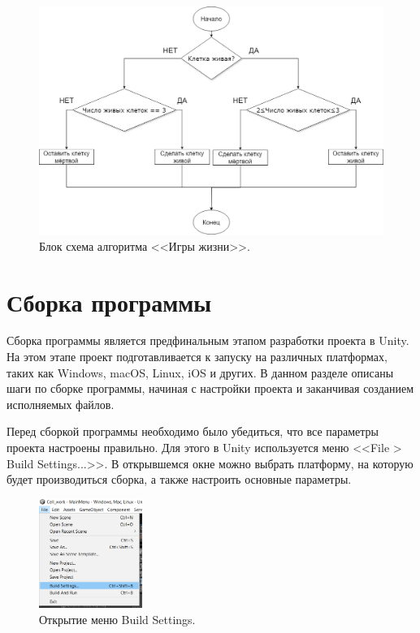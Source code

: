 \begin{figure}[H]
	\centering
	\includegraphics[width=1\textwidth]{images/БлокСхема.png}  
	\caption{Блок схема алгоритма <<Игры жизни>>.}
	\label{fig4}
\end{figure}

\section{\label{sec:ch02/sec01/sub05}Сборка программы}

Сборка программы является предфинальным этапом разработки проекта в Unity. На этом этапе проект подготавливается к запуску на различных платформах, таких как Windows, macOS, Linux, iOS и других. В данном разделе описаны шаги по сборке программы, начиная с настройки проекта и заканчивая созданием исполняемых файлов.

Перед сборкой программы необходимо было убедиться, что все параметры проекта настроены правильно. Для этого в Unity используется меню <<File > Build Settings...>>. В открывшемся окне можно выбрать платформу, на которую будет производиться сборка, а также настроить основные параметры.

\begin{figure}[H]
	\centering
	\includegraphics[width=0.3\textwidth]{images/build1.png}  
	\caption{Открытие меню Build Settings.}
	\label{fig5}
\end{figure}


